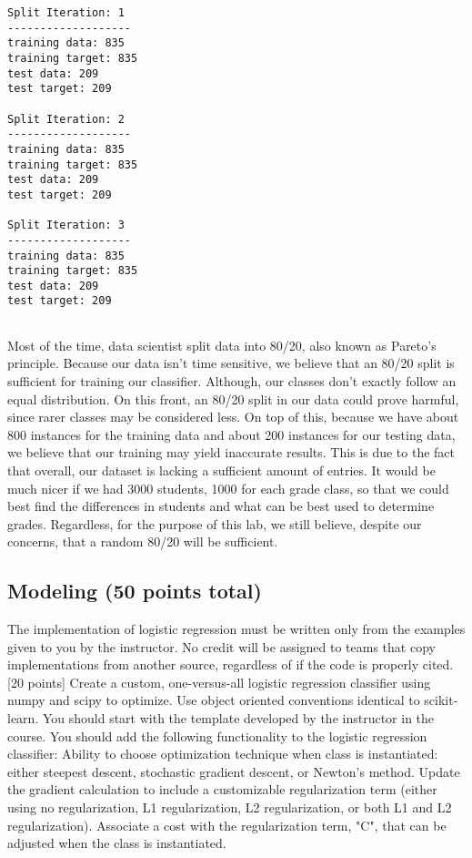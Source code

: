 \documentclass[11pt]{article}
\begin{document}
    \begin{Verbatim}[commandchars=\\\{\}]
Split Iteration: 1
-------------------
training data: 835
training target: 835
test data: 209
test target: 209

Split Iteration: 2
-------------------
training data: 835
training target: 835
test data: 209
test target: 209

Split Iteration: 3
-------------------
training data: 835
training target: 835
test data: 209
test target: 209


    \end{Verbatim}

    Most of the time, data scientist split data into 80/20, also known as
Pareto's principle. Because our data isn't time sensitive, we believe
that an 80/20 split is sufficient for training our classifier. Although,
our classes don't exactly follow an equal distribution. On this front,
an 80/20 split in our data could prove harmful, since rarer classes may
be considered less. On top of this, because we have about 800 instances
for the training data and about 200 instances for our testing data, we
believe that our training may yield inaccurate results. This is due to
the fact that overall, our dataset is lacking a sufficient amount of
entries. It would be much nicer if we had 3000 students, 1000 for each
grade class, so that we could best find the differences in students and
what can be best used to determine grades. Regardless, for the purpose
of this lab, we still believe, despite our concerns, that a random 80/20
will be sufficient.

    \subsection{Modeling (50 points total)}\label{modeling-50-points-total}

 The implementation of logistic regression must be written only from the
examples given to you by the instructor. No credit will be assigned to
teams that copy implementations from another source, regardless of if
the code is properly cited. {[}20 points{]} Create a custom,
one-versus-all logistic regression classifier using numpy and scipy to
optimize. Use object oriented conventions identical to scikit-learn. You
should start with the template developed by the instructor in the
course. You should add the following functionality to the logistic
regression classifier: Ability to choose optimization technique when
class is instantiated: either steepest descent, stochastic gradient
descent, or Newton's method. Update the gradient calculation to include
a customizable regularization term (either using no regularization, L1
regularization, L2 regularization, or both L1 and L2 regularization).
Associate a cost with the regularization term, "C", that can be adjusted
when the class is instantiated.\\
\end{document}
